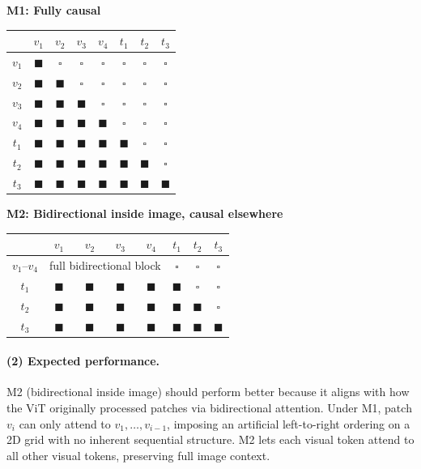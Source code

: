 \documentclass[11pt]{article}
\begin{document}
\textbf{M1: Fully causal}
\begin{center}
\begin{tabular}{c|ccccccc}
 & $v_1$ & $v_2$ & $v_3$ & $v_4$ & $t_1$ & $t_2$ & $t_3$ \\
\hline
$v_1$ & $\blacksquare$ & $\square$ & $\square$ & $\square$ & $\square$ & $\square$ & $\square$ \\
$v_2$ & $\blacksquare$ & $\blacksquare$ & $\square$ & $\square$ & $\square$ & $\square$ & $\square$ \\
$v_3$ & $\blacksquare$ & $\blacksquare$ & $\blacksquare$ & $\square$ & $\square$ & $\square$ & $\square$ \\
$v_4$ & $\blacksquare$ & $\blacksquare$ & $\blacksquare$ & $\blacksquare$ & $\square$ & $\square$ & $\square$ \\
$t_1$ & $\blacksquare$ & $\blacksquare$ & $\blacksquare$ & $\blacksquare$ & $\blacksquare$ & $\square$ & $\square$ \\
$t_2$ & $\blacksquare$ & $\blacksquare$ & $\blacksquare$ & $\blacksquare$ & $\blacksquare$ & $\blacksquare$ & $\square$ \\
$t_3$ & $\blacksquare$ & $\blacksquare$ & $\blacksquare$ & $\blacksquare$ & $\blacksquare$ & $\blacksquare$ & $\blacksquare$ \\
\end{tabular}
\end{center}

\textbf{M2: Bidirectional inside image, causal elsewhere}
\begin{center}
\begin{tabular}{c|ccccccc}
 & $v_1$ & $v_2$ & $v_3$ & $v_4$ & $t_1$ & $t_2$ & $t_3$ \\
\hline
$v_1$--$v_4$ & \multicolumn{4}{c|}{full bidirectional block} & $\square$ & $\square$ & $\square$ \\
$t_1$ & $\blacksquare$ & $\blacksquare$ & $\blacksquare$ & $\blacksquare$ & $\blacksquare$ & $\square$ & $\square$ \\
$t_2$ & $\blacksquare$ & $\blacksquare$ & $\blacksquare$ & $\blacksquare$ & $\blacksquare$ & $\blacksquare$ & $\square$ \\
$t_3$ & $\blacksquare$ & $\blacksquare$ & $\blacksquare$ & $\blacksquare$ & $\blacksquare$ & $\blacksquare$ & $\blacksquare$ \\
\end{tabular}
\end{center}

\paragraph{(2) Expected performance.}
M2 (bidirectional inside image) should perform better because it aligns with how the ViT originally processed patches via bidirectional attention. Under M1, patch $v_i$ can only attend to $v_1,\ldots,v_{i-1}$, imposing an artificial left-to-right ordering on a 2D grid with no inherent sequential structure. M2 lets each visual token attend to all other visual tokens, preserving full image context.
\end{document}

